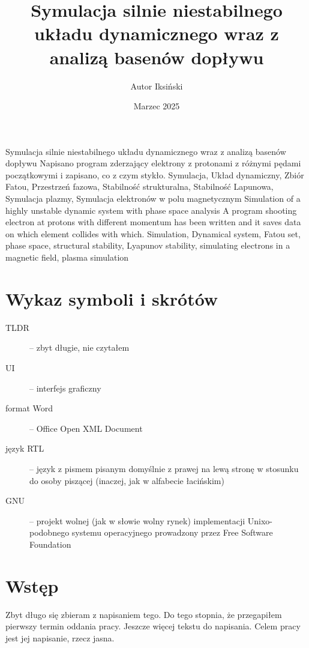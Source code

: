 \documentclass{SGGW-thesis}
\title{Symulacja silnie niestabilnego układu dynamicznego wraz z analizą basenów dopływu}
\author{Autor Iksiński}
\date{Marzec 2025}
\begin{document}
\maketitle
\statementpage
\abstractpage
{Symulacja silnie niestabilnego układu dynamicznego wraz z analizą basenów dopływu}
{Napisano program zderzający elektrony z protonami z różnymi pędami początkowymi i zapisano, co z czym stykło.}
{Symulacja, Układ dynamiczny, Zbiór Fatou, Przestrzeń fazowa, Stabilność strukturalna, Stabilność Lapunowa, Symulacja plazmy, Symulacja elektronów w polu magnetycznym}
{Simulation of a highly unstable dynamic system with phase space analysis}
{A program shooting electron at protons with different momentum has been written and it saves data on which element collides with which.}
{Simulation, Dynamical system, Fatou set, phase space, structural stability, Lyapunov stability, simulating electrons in a magnetic field, plasma simulation}

{
  \doublespacing %
  \tableofcontents
}

\startchapterfromoddpage %

\chapter{Wykaz symboli i skrótów}
\begin{description}
  \item [TLDR] -- zbyt długie, nie czytałem
  \item [UI] -- interfejs graficzny
  \item [format Word] -- Office Open XML Document
  \item [język RTL] -- język z pismem pisanym domyślnie z prawej na lewą stronę w stosunku do osoby piszącej (inaczej, jak w alfabecie łacińskim)
  \item [GNU] -- projekt wolnej (jak w słowie wolny rynek) implementacji Unixo-podobnego systemu operacyjnego prowadzony przez Free Software Foundation
\end{description}

\chapter{Wstęp}
Zbyt długo się zbieram z napisaniem tego. Do tego stopnia, że przegapiłem pierwszy termin oddania pracy. Jeszcze więcej tekstu do napisania. Celem pracy jest jej napisanie, rzecz jasna.
\end{document}
